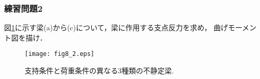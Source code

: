 ﻿\documentclass[10pt,a4j]{jarticle}
\begin{document}
\subsubsection{練習問題2}
図\ref{fig:fig8_2}に示す梁(a)から(c)について，梁に作用する支点反力を求め，
曲げモーメント図を描け．
\begin{figure}[h]
	\begin{center}
	\texttt{[image: fig8\_2.eps]} 
	\end{center}
	\caption{支持条件と荷重条件の異なる3種類の不静定梁. } 
	\label{fig:fig8_2}
\end{figure}
\end{document}
